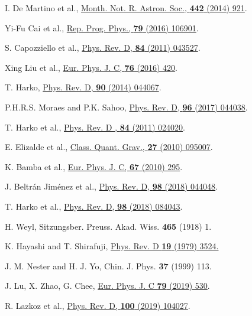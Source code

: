 \begin{thebibliography}{90}
 I. De Martino et al., \href{https://doi.org/10.1093/mnras/stu903}{Month. Not. R. Astron. Soc., \textbf{442} (2014) 921}.

 Yi-Fu Cai et al., \href{https://doi.org/10.1088/0034-4885/79/10/106901}{Rep. Prog. Phys., \textbf{79}  (2016) 106901}.

 S. Capozziello et al., \href{https://doi.org/10.1103/PhysRevD.84.043527}{Phys. Rev. D, \textbf{84} (2011) 043527}. 

 Xing Liu et al., \href{https://doi.org/10.1140/epjc/s10052-016-4275-6}{Eur. Phys. J. C, \textbf{76} (2016) 420}.

 T. Harko, \href{https://doi.org/10.1103/PhysRevD.90.044067}{Phys. Rev. D, \textbf{90} (2014) 044067}.

 P.H.R.S. Moraes and P.K. Sahoo, \href{https://doi.org/10.1103/PhysRevD.96.044038}{Phys. Rev. D, \textbf{96} (2017) 044038}.

 T. Harko et al., \href{https://doi.org/10.1103/PhysRevD.84.024020}{Phys. Rev. D , \textbf{84} (2011) 024020}.

 E. Elizalde et al., \href{https://doi.org/10.1088/0264-9381/27/9/095007}{Class. Quant. Grav., \textbf{27} (2010) 095007}.

 K. Bamba et al., \href{https://doi.org/10.1140/epjc/s10052-010-1292-8}{Eur. Phys. J. C, \textbf{67} (2010) 295}.

 J. Beltr\'{a}n Jim\'{e}nez et al., \href{https://doi.org/10.1103/PhysRevD.98.044048}{Phys. Rev. D, \textbf{98} (2018) 044048}.

 T. Harko et al., \href{https://doi.org/10.1103/PhysRevD.98.084043}{Phys. Rev. D, \textbf{98} (2018) 084043}.

 H. Weyl, Sitzungsber. Preuss. Akad. Wiss. \textbf{465} (1918) 1. 

 K. Hayashi and T. Shirafuji, \href{https://doi.org/10.1103/PhysRevD.19.3524}{Phys. Rev. D \textbf{19} (1979) 3524.}

 J. M. Nester and H. J. Yo, Chin. J. Phys. \textbf{37} (1999) 113.

 J. Lu, X. Zhao, G. Chee, \href{https://doi.org/10.1140/epjc/s10052-019-7038-3}{Eur. Phys. J. C \textbf{79} (2019) 530}.

 R. Lazkoz et al., \href{https://doi.org/10.1103/PhysRevD.100.104027}{Phys. Rev. D, \textbf{100} (2019) 104027}.


\end{thebibliography}
